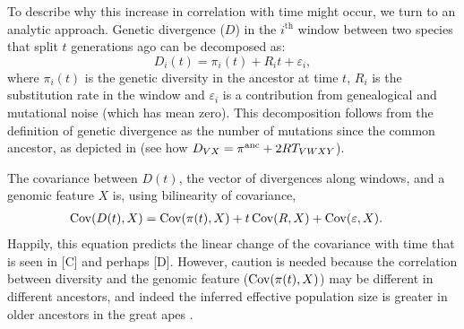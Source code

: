 To describe why this increase in correlation with time might occur, we turn to an analytic approach.
Genetic divergence ($D$) in the $i^\text{th}$ window between two species that split $t$ generations ago can be decomposed as:
$$D_i(t) = \pi_i(t) + R_i t + \varepsilon_i,$$
where $\pi_i(t)$ is the genetic diversity in the ancestor at time $t$, 
$R_i$ is the substitution rate in the window and $\varepsilon_i$ is a contribution from genealogical and mutational noise (which has mean zero). 
This decomposition follows from the definition of genetic divergence as the number of mutations since the common ancestor,
as depicted in  (see how $D_{VX} = \pi^{\mathrm{anc}} + 2RT_{VWXY}$).

The covariance between $D(t)$, the vector of divergences along windows, and a genomic feature $X$
is, using bilinearity of covariance,
\begin{align}
    \Cov(D(t),X) &= \Cov(\pi(t), X) + t\Cov(R,X) + \Cov(\varepsilon, X) \label{eqcov} . %
\end{align}
Happily, this equation predicts the linear change of the covariance with time that is seen in [C] and perhaps [D].
However, caution is needed because the correlation between diversity and the genomic feature ($\operatorname{Cov}(\pi(t), X)$)
may be different in different ancestors,
and indeed the inferred effective population size is greater in older ancestors in the great apes .

